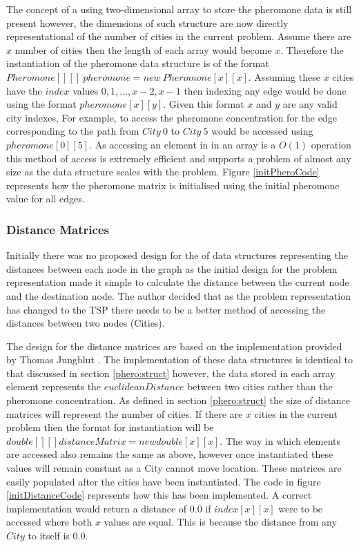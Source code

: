 The concept of a using two-dimensional array to store the pheromone data is still present however, the dimensions of such structure are now directly representational of the number of cities in the current problem. Assume there are $x$ number of cities then the length of each array would become $x$. Therefore the instantiation of the pheromone data structure is of the format $Pheromone[][]\  pheromone = new\ Pheromone[x][x]$. Assuming these $x$ cities have the $index$ values $0, 1, ..., x-2, x-1$ then indexing any edge would be done using the format $pheromone[x][y]$. Given this format $x$ and $y$ are any valid city indexes, For example, to access the pheromone concentration for the edge corresponding to the path from $City\ 0$ to $City\ 5$ would be accessed using $pheromone[0][5]$. As accessing an element in in an array is a $O(1)$ operation this method of access is extremely efficient and supports a problem of almost any size as the data structure scales with the problem. Figure \ref{initPheroCode} represents how the pheromone matrix is initialised using the initial pheromone value for all edges.

\subsubsection{Distance Matrices}

Initially there was no proposed design for the of data structures representing the distances between each node in the graph as the initial design for the problem representation made it simple to calculate the distance between the current node and the destination node. The author decided that as the problem representation has changed to the TSP there needs to be a better method of accessing the distances between two nodes (Cities).

The design for the distance matrices are based on the implementation provided by Thomas Jungblut \cite{tjung:aco:blog}. The implementation of these data structures is identical to that discussed in section \ref{phero:struct} however, the data stored in each array element represents the $euclideanDistance$ between two cities rather than the pheromone concentration. As defined in section \ref{phero:struct} the size of distance matrices will represent the number of cities. If there are $x$ cities in the current problem then the format for instantiation will be $double[][] distanceMatrix = new double[x][x]$. The way in which elements are accessed also remains the same as above, however once instantiated these values will remain constant as a City cannot move location. These matrices are easily populated after the cities have been instantiated. The code in figure \ref{initDistanceCode} represents how this has been implemented. A correct implementation would return a distance of $0.0$ if $index[x][x]$ were to be accessed where both $x$ values are equal. This is because the distance from any $City$ to itself is $0.0$.

